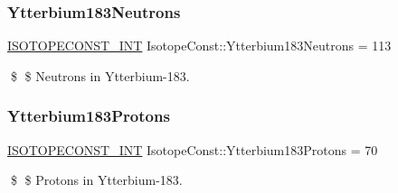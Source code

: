 \subsubsection{\texorpdfstring{Ytterbium183\+Neutrons}{Ytterbium183Neutrons}}
{\footnotesize\ttfamily \mbox{\hyperlink{group___isotope_const-_macros_ga5f18360b3e99483a35c32d789e62621c}{I\+S\+O\+T\+O\+P\+E\+C\+O\+N\+S\+T\+\_\+\+I\+NT}} Isotope\+Const\+::\+Ytterbium183\+Neutrons = 113}

\$ \$ Neutrons in Ytterbium-\/183. \mbox{\label{group___isotope_const-_ytterbium-_yb183_ga612e9493f367179e0bd6ec8e9e386e7f}} 
\subsubsection{\texorpdfstring{Ytterbium183\+Protons}{Ytterbium183Protons}}
{\footnotesize\ttfamily \mbox{\hyperlink{group___isotope_const-_macros_ga5f18360b3e99483a35c32d789e62621c}{I\+S\+O\+T\+O\+P\+E\+C\+O\+N\+S\+T\+\_\+\+I\+NT}} Isotope\+Const\+::\+Ytterbium183\+Protons = 70}

\$ \$ Protons in Ytterbium-\/183. 